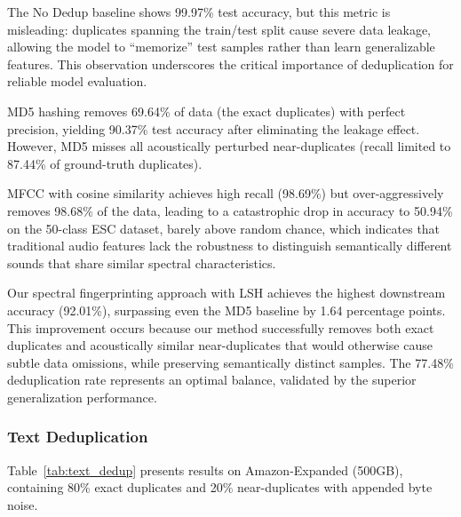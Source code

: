 \documentclass[conference]{IEEEtran}
\begin{document}
The No Dedup baseline shows 99.97\% test accuracy, but this metric is misleading: duplicates spanning the train/test split cause severe data leakage, allowing the model to ``memorize'' test samples rather than learn generalizable features. This observation underscores the critical importance of deduplication for reliable model evaluation.

MD5 hashing removes 69.64\% of data (the exact duplicates) with perfect precision, yielding 90.37\% test accuracy after eliminating the leakage effect. However, MD5 misses all acoustically perturbed near-duplicates (recall limited to 87.44\% of ground-truth duplicates).

MFCC with cosine similarity achieves high recall (98.69\%) but over-aggressively removes 98.68\% of the data, leading to a catastrophic drop in accuracy to 50.94\% on the 50-class ESC dataset, barely above random chance, which indicates that traditional audio features lack the robustness to distinguish semantically different sounds that share similar spectral characteristics.

Our spectral fingerprinting approach with LSH achieves the highest downstream accuracy (92.01\%), surpassing even the MD5 baseline by 1.64 percentage points. This improvement occurs because our method successfully removes both exact duplicates and acoustically similar near-duplicates that would otherwise cause subtle data omissions, while preserving semantically distinct samples. The 77.48\% deduplication rate represents an optimal balance, validated by the superior generalization performance.

\subsubsection{Text Deduplication}
Table~\ref{tab:text_dedup} presents results on Amazon-Expanded (500GB), containing 80\% exact duplicates and 20\% near-duplicates with appended byte noise.
\end{document}
